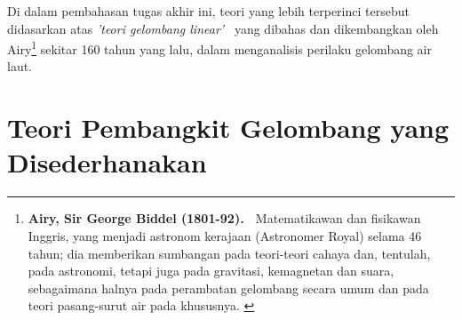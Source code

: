 \documentclass[12pt,a4paper]{report}
\begin{document}
Di dalam pembahasan tugas akhir ini, teori yang lebih terperinci tersebut
didasarkan atas {\itshape'teori gelombang linear'\ } yang dibahas dan
dikembangkan oleh Airy\footnote[1]{\textbf{Airy, Sir George Biddel (1801-92).%
}$\;$ Matematikawan dan fisikawan Inggris, yang menjadi astronom
kerajaan (Astronomer Royal) selama 46 tahun; dia memberikan
sumbangan pada teori-teori cahaya dan, tentulah, pada astronomi,
tetapi juga pada gravitasi, kemagnetan dan suara, sebagaimana
halnya pada perambatan gelombang secara umum dan pada teori
pasang-surut air pada khususnya. \cite{jrs}} sekitar 160 tahun
yang lalu, dalam menganalisis perilaku gelombang air laut.
\cite{aph}

\section{Teori Pembangkit Gelombang yang\\ Disederhanakan}
\end{document}
